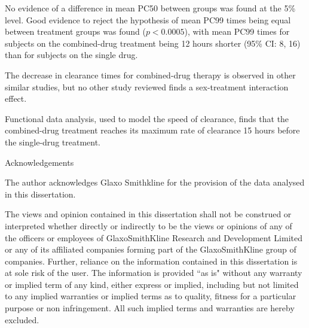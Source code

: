 \documentclass[a4paper,12pt,openright,twoside]{book}
\begin{document}
No evidence of a difference in mean PC50 between groups was found at the 5\% level. Good evidence to reject the hypothesis of mean PC99 times being equal between treatment groups was found ($p<0.0005$), with mean PC99 times for subjects on the combined-drug treatment being 12 hours shorter (95\% CI: 8, 16) than for subjects on the single drug.

The decrease in clearance times for combined-drug therapy is observed in other similar studies, but no other study reviewed finds a sex-treatment interaction effect.

Functional data analysis, used to model the speed of clearance, finds that the combined-drug treatment reaches its maximum rate of clearance 15 hours before the single-drug treatment.
\pagebreak
\begin{center}
{\large Acknowledgements}\\[1cm]
\end{center}
The author acknowledges Glaxo Smithkline for the provision of the data analysed in this dissertation.

\pagebreak
\vspace*{\fill}
{\large The views and opinion contained in this dissertation shall not be construed or interpreted whether directly or indirectly to be the views or opinions of any of the officers or employees of GlaxoSmithKline Research and Development Limited or any of its affiliated companies forming part of the GlaxoSmithKline group of companies. Further, reliance on the information contained in this dissertation is at sole risk of the user. The information is provided ``as is" without any warranty or implied term of any kind, either express or implied, including but not limited to any implied warranties or implied terms as to quality, fitness for a particular purpose or non infringement. All such implied terms and warranties are hereby excluded.}
\vspace*{\fill}
\tableofcontents

\mainmatter
\setlength{\parindent}{0.0in}
\setlength{\parskip}{0.1in}







{\backmatter

\renewcommand{\bibname}{References}
{\singlespace}}
\addappheadtotoc
\appendix
\appendixpage

\end{document}
